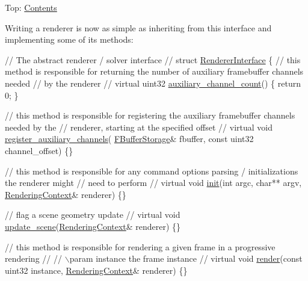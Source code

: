 Top\+: \hyperlink{_overture_contents_page}{Contents}

\begin{DoxyParagraph}{}
Writing a renderer is now as simple as inheriting from this interface and implementing some of its methods\+: ~\newline

\begin{DoxyCode}
\textcolor{comment}{// The abstract renderer / solver interface}
\textcolor{comment}{//}
\textcolor{keyword}{struct }\hyperlink{struct_renderer_interface}{RendererInterface}
\{
   \textcolor{comment}{// this method is responsible for returning the number of auxiliary framebuffer channels needed}
   \textcolor{comment}{// by the renderer}
   \textcolor{comment}{//}
   \textcolor{keyword}{virtual} uint32 \hyperlink{struct_renderer_interface_a0bedb16a0103c95dae460afef2a0fc2a}{auxiliary\_channel\_count}() \{ \textcolor{keywordflow}{return} 0; \}

   \textcolor{comment}{// this method is responsible for registering the auxiliary framebuffer channels needed by the}
   \textcolor{comment}{// renderer, starting at the specified offset}
   \textcolor{comment}{//}
   \textcolor{keyword}{virtual} \textcolor{keywordtype}{void} \hyperlink{struct_renderer_interface_aca2dd8b8b27e3e6f7fcf81c0d8d17ce5}{register\_auxiliary\_channels}(
      \hyperlink{struct_f_buffer_storage}{FBufferStorage}& fbuffer, \textcolor{keyword}{const} uint32 channel\_offset) \{\}

   \textcolor{comment}{// this method is responsible for any command options parsing / initializations the renderer might}
   \textcolor{comment}{// need to perform}
   \textcolor{comment}{//}
   \textcolor{keyword}{virtual} \textcolor{keywordtype}{void} \hyperlink{struct_renderer_interface_a2ead9b943d6d48fcd32872e0005ebe63}{init}(\textcolor{keywordtype}{int} argc, \textcolor{keywordtype}{char}** argv, \hyperlink{struct_rendering_context}{RenderingContext}& renderer) \{\}

   \textcolor{comment}{// flag a scene geometry update}
   \textcolor{comment}{//}
   \textcolor{keyword}{virtual} \textcolor{keywordtype}{void} \hyperlink{struct_renderer_interface_a754143d3228c27eab32f1760217afe56}{update\_scene}(\hyperlink{struct_rendering_context}{RenderingContext}& renderer) \{\}

   \textcolor{comment}{// this method is responsible for rendering a given frame in a progressive rendering}
   \textcolor{comment}{//}
   \textcolor{comment}{// \(\backslash\)param   instance        the frame instance}
   \textcolor{comment}{//}
   \textcolor{keyword}{virtual} \textcolor{keywordtype}{void} \hyperlink{struct_renderer_interface_aa64254dd44c94929b05092dc8d74f29d}{render}(\textcolor{keyword}{const} uint32 instance, \hyperlink{struct_rendering_context}{RenderingContext}& renderer) \{\}


\end{DoxyCode}
\end{DoxyParagraph}
